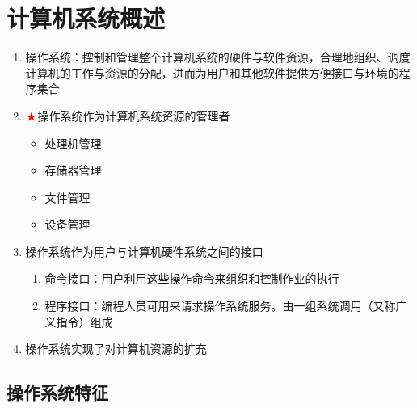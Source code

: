 \documentclass[./operating-systems.tex]{subfiles}
\begin{document}
    \section{计算机系统概述}

    \begin{enumerate}
        \item 操作系统：控制和管理整个计算机系统的硬件与软件资源，合理地组织、调度计算机的工作与资源的分配，进而为用户和其他软件提供方便接口与环境的程序集合
        \item $\color{red}{\bigstar}$操作系统作为计算机系统资源的管理者
        \begin{itemize}
            \item 处理机管理
            \item 存储器管理
            \item 文件管理
            \item 设备管理
        \end{itemize}
        \item 操作系统作为用户与计算机硬件系统之间的接口
        \begin{enumerate}
            \item 命令接口：用户利用这些操作命令来组织和控制作业的执行
            \item 程序接口：编程人员可用来请求操作系统服务。由一组系统调用（又称广义指令）组成
        \end{enumerate}
        \item 操作系统实现了对计算机资源的扩充
    \end{enumerate}

    \subsection{操作系统特征}
\end{document}
